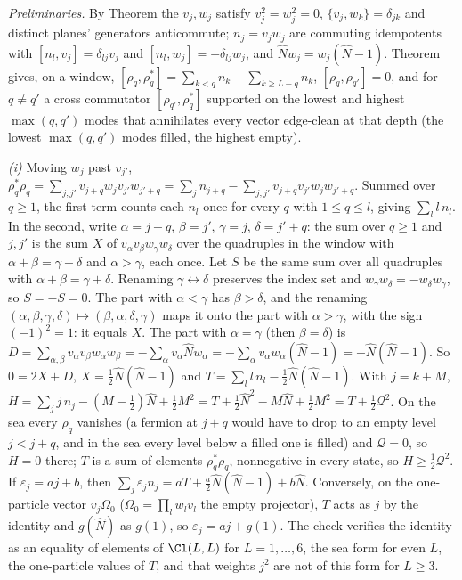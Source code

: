 \emph{Preliminaries.} By Theorem  the $v_{j}, w_{j}$ satisfy $v_{j}^{2} = w_{j}^{2} = 0$, $\{v_{j}, w_{k}\} = \delta_{jk}$ and distinct planes' generators anticommute; $n_{j} = v_{j}w_{j}$ are commuting idempotents with $[n_{l}, v_{j}] = \delta_{lj}v_{j}$ and $[n_{l}, w_{j}] = -\delta_{lj}w_{j}$, and $\hat Nw_{j} = w_{j}(\hat N - 1)$. Theorem  gives, on a window, $[\rho_{q}, \rho_{q}^{*}] = \sum_{k < q}n_{k} - \sum_{k \ge L - q}n_{k}$, $[\rho_{q}, \rho_{q'}] = 0$, and for $q \ne q'$ a cross commutator $[\rho_{q'}, \rho_{q}^{*}]$ supported on the lowest and highest $\max(q, q')$ modes that annihilates every vector edge-clean at that depth (the lowest $\max(q, q')$ modes filled, the highest empty).

\emph{(i)} Moving $w_{j}$ past $v_{j'}$, $\rho_{q}^{*}\rho_{q} = \sum_{j, j'}v_{j + q}w_{j}v_{j'}w_{j' + q} = \sum_{j}n_{j + q} - \sum_{j, j'}v_{j + q}v_{j'}w_{j}w_{j' + q}$. Summed over $q \ge 1$, the first term counts each $n_{l}$ once for every $q$ with $1 \le q \le l$, giving $\sum_{l}l\,n_{l}$. In the second, write $\alpha = j + q$, $\beta = j'$, $\gamma = j$, $\delta = j' + q$: the sum over $q \ge 1$ and $j, j'$ is the sum $X$ of $v_{\alpha}v_{\beta}w_{\gamma}w_{\delta}$ over the quadruples in the window with $\alpha + \beta = \gamma + \delta$ and $\alpha > \gamma$, each once. Let $S$ be the same sum over all quadruples with $\alpha + \beta = \gamma + \delta$. Renaming $\gamma \leftrightarrow \delta$ preserves the index set and $w_{\gamma}w_{\delta} = -w_{\delta}w_{\gamma}$, so $S = -S = 0$. The part with $\alpha < \gamma$ has $\beta > \delta$, and the renaming $(\alpha, \beta, \gamma, \delta) \mapsto (\beta, \alpha, \delta, \gamma)$ maps it onto the part with $\alpha > \gamma$, with the sign $(-1)^{2} = 1$: it equals $X$. The part with $\alpha = \gamma$ (then $\beta = \delta$) is $D = \sum_{\alpha, \beta}v_{\alpha}v_{\beta}w_{\alpha}w_{\beta} = -\sum_{\alpha}v_{\alpha}\hat Nw_{\alpha} = -\sum_{\alpha}v_{\alpha}w_{\alpha}(\hat N - 1) = -\hat N(\hat N - 1)$. So $0 = 2X + D$, $X = \tfrac12\hat N(\hat N - 1)$ and $T = \sum_{l}l\,n_{l} - \tfrac12\hat N(\hat N - 1)$. With $j = k + M$, $H = \sum_{j}j\,n_{j} - (M - \tfrac12)\hat N + \tfrac12M^{2} = T + \tfrac12\hat N^{2} - M\hat N + \tfrac12M^{2} = T + \tfrac12\mathcal{Q}^{2}$. On the sea every $\rho_{q}$ vanishes (a fermion at $j + q$ would have to drop to an empty level $j < j + q$, and in the sea every level below a filled one is filled) and $\mathcal{Q} = 0$, so $H = 0$ there; $T$ is a sum of elements $\rho_{q}^{*}\rho_{q}$, nonnegative in every state, so $H \ge \tfrac12\mathcal{Q}^{2}$. If $\varepsilon_{j} = aj + b$, then $\sum_{j}\varepsilon_{j}n_{j} = aT + \tfrac{a}{2}\hat N(\hat N - 1) + b\hat N$. Conversely, on the one-particle vector $v_{j}\Omega_{0}$ ($\Omega_{0} = \prod_{l}w_{l}v_{l}$ the empty projector), $T$ acts as $j$ by the identity and $g(\hat N)$ as $g(1)$, so $\varepsilon_{j} = aj + g(1)$. The check verifies the identity as an equality of elements of $\Cl(L, L)$ for $L = 1, \dots, 6$, the sea form for even $L$, the one-particle values of $T$, and that weights $j^{2}$ are not of this form for $L \ge 3$.

